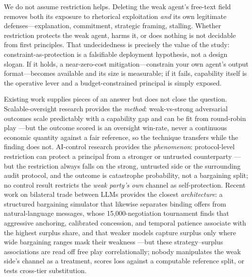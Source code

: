 \documentclass[conference]{IEEEtran}
\begin{document}
We do not assume restriction helps. Deleting the weak agent's free-text field removes both its exposure to rhetorical exploitation \emph{and} its own legitimate defenses---explanation, commitment, strategic framing, stalling. Whether restriction protects the weak agent, harms it, or does nothing is not decidable from first principles. That undecidedness is precisely the value of the study: constraint-as-protection is a falsifiable deployment hypothesis, not a design slogan. If it holds, a near-zero-cost mitigation---constrain your own agent's output format---becomes available and its size is measurable; if it fails, capability itself is the operative lever and a budget-constrained principal is simply exposed.

Existing work supplies pieces of an answer but does not close the question. Scalable-oversight research provides the \emph{method}: weak-vs-strong adversarial outcomes scale predictably with a capability gap and can be fit from round-robin play \cite{ScalingLawsOversight}---but the outcome scored is an oversight win-rate, never a continuous economic quantity against a fair reference, so the technique transfers while the finding does not. AI-control research provides the \emph{phenomenon}: protocol-level restriction can protect a principal from a stronger or untrusted counterparty \cite{AIControl,ControlTax}---but the restriction always falls on the strong, untrusted side or the surrounding audit protocol, and the outcome is catastrophe probability, not a bargaining split; no control result restricts the \emph{weak party's own} channel as self-protection. Recent work on bilateral trade between LLMs provides the closest \emph{architecture}: a structured bargaining simulator that likewise separates binding offers from natural-language messages, whose 15{,}000-negotiation tournament finds that aggressive anchoring, calibrated concession, and temporal patience associate with the highest surplus share, and that weaker models capture surplus only where wide bargaining ranges mask their weakness \cite{BilateralTrade2604}---but these strategy--surplus associations are read off free play correlationally; nobody manipulates the weak side's channel as a treatment, scores loss against a computable reference split, or tests cross-tier substitution.
\end{document}
